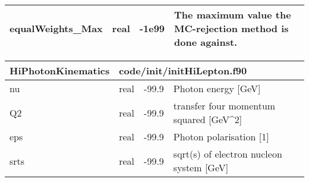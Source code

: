 \documentclass{article}
\begin{document}
\begin{longtable}{llll}
\midrule
equalWeights\_Max & \begin{minipage}[t]{2cm}real\end{minipage} & \begin{minipage}[t]{2cm}-1e99\end{minipage} & \begin{minipage}[t]{12cm}The maximum value the MC-rejection method is done against.\end{minipage}\\*
\bottomrule
\end{longtable}
{ }




\begin{longtable}{llll}
\toprule
\textbf{\large{HiPhotonKinematics}} & \multicolumn{3}{l}{\footnotesize{code/init/initHiLepton.f90}}\\*
\midrule
\endfirsthead
\midrule
\endhead
nu & \begin{minipage}[t]{2cm}real\end{minipage} & \begin{minipage}[t]{2cm}-99.9\end{minipage} & \begin{minipage}[t]{12cm}Photon energy [GeV]\end{minipage}\\*
\midrule
Q2 & \begin{minipage}[t]{2cm}real\end{minipage} & \begin{minipage}[t]{2cm}-99.9\end{minipage} & \begin{minipage}[t]{12cm}transfer four momentum squared [GeV\^{}2]\end{minipage}\\*
\midrule
eps & \begin{minipage}[t]{2cm}real\end{minipage} & \begin{minipage}[t]{2cm}-99.9\end{minipage} & \begin{minipage}[t]{12cm}Photon polarisation [1]\end{minipage}\\*
\midrule
srts & \begin{minipage}[t]{2cm}real\end{minipage} & \begin{minipage}[t]{2cm}-99.9\end{minipage} & \begin{minipage}[t]{12cm}sqrt(s) of electron nucleon system [GeV]\end{minipage}\\*

\end{longtable}
\end{document}
